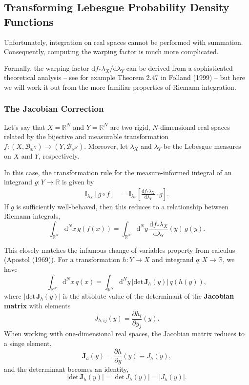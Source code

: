 \documentclass[
  letterpaper,
  DIV=11,
  numbers=noendperiod]{scrartcl}
\begin{document}
\subsection{Transforming Lebesgue Probability Density
Functions}\label{transforming-lebesgue-probability-density-functions}

Unfortunately, integration on real spaces cannot be performed with
summation. Consequently, computing the warping factor is much more
complicated.

Formally, the warping factor
\(\mathrm{d} f_{*} \lambda_{X} / \mathrm{d} \lambda_{Y}\) can be derived
from a sophisticated theoretical analysis -- see for example Theorem
2.47 in Folland (1999) -- but here we will work it out from the more
familiar properties of Riemann integration.

\subsubsection{The Jacobian Correction}\label{the-jacobian-correction}

Let's say that \(X = \mathbb{R}^{N}\) and \(Y = \mathbb{R}^{N}\) are two
rigid, \(N\)-dimensional real spaces related by the bijective and
measurable transformation
\(f : (X, \mathcal{B}_{\mathbb{R}^{N}}) \rightarrow
     (Y, \mathcal{B}_{\mathbb{R}^{N}})\). Moreover, let \(\lambda_{X}\)
and \(\lambda_{Y}\) be the Lebesgue measures on \(X\) and \(Y\),
respectively.

In this case, the transformation rule for the measure-informed integral
of an integrand \(g : Y \rightarrow \mathbb{R}\) is given by
\begin{align*}
\mathbb{I}_{\lambda_{X}} [ g \circ f ]
&=
\mathbb{I}_{\lambda_{Y}} \left[
\frac{ \mathrm{d} f_{*} \lambda_{X} }{ \mathrm{d} \lambda_{Y}} \cdot g
\right].
\end{align*} If \(g\) is sufficiently well-behaved, then this reduces to
a relationship between Riemann integrals, \[
\int_{\mathbb{R}^{N}} \mathrm{d}^{N} x \, g(f(x))
=
\int_{\mathbb{R}^{N}} \mathrm{d}^{N} y \,
\frac{ \mathrm{d} f_{*} \lambda_{X} }{ \mathrm{d} \lambda_{Y}}(y) \,
g(y).
\]

This closely matches the infamous change-of-variables property from
calculus (Apostol (1969)). For a transformation \(h : Y \rightarrow X\)
and integrand \(q : X \rightarrow \mathbb{R}\), we have \[
\int_{\mathbb{R}^{N}} \mathrm{d}^{N} x \, q(x)
=
\int_{\mathbb{R}^{N}} \mathrm{d}^{N} y \,
| \mathrm{det} \,  \mathbf{J}_{h}(y) | \, q(h(y)),
\] where \(| \mathrm{det} \, \mathbf{J}_{h}(y) |\) is the absolute value
of the determinant of the \textbf{Jacobian matrix} with elements \[
J_{h, ij}(y) = \frac{ \partial h_{i} }{ \partial y_{j} } (y).
\] When working with one-dimensional real spaces, the Jacobian matrix
reduces to a singe element, \[
\mathbf{J}_{h}(y) 
= \frac{ \partial h }{ \partial y } (y) 
\equiv J_{h}(y),
\] and the determinant becomes an identity, \[
| \mathrm{det} \, \mathbf{J}_{h}(y) |
=
| \mathrm{det} \, J_{h}(y) |
=
| J_{h}(y) |.
\]
\end{document}
